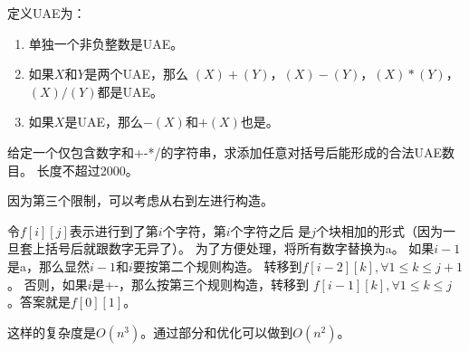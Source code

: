 \begin{prob}
	定义UAE为：
	\begin{enumerate}
		\item 单独一个非负整数是UAE。
		\item 如果$X$和$Y$是两个UAE，那么
			$(X)+(Y)$，$(X)-(Y)$，$(X)*(Y)$，$(X)/(Y)$都是UAE。
		\item 如果$X$是UAE，那么$-(X)$和$+(X)$也是。
	\end{enumerate}
	给定一个仅包含数字和+-*/的字符串，求添加任意对括号后能形成的合法UAE数目。
	长度不超过2000。
\end{prob}

\begin{sol}
	因为第三个限制，可以考虑从右到左进行构造。\par
	令$f[i][j]$表示进行到了第$i$个字符，第$i$个字符之后
	是$j$个块相加的形式（因为一旦套上括号后就跟数字无异了）。
	为了方便处理，将所有数字替换为a。
	如果$i-1$是a，那么显然$i-1$和$i$要按第二个规则构造。
	转移到$f[i-2][k], \forall 1 \le k \le j+1$。
	否则，如果$i$是+-，那么按第三个规则构造，转移到
	$f[i-1][k], \forall 1 \le k \le j$。答案就是$f[0][1]$。
	\par 这样的复杂度是$O(n^3)$。通过部分和优化可以做到$O(n^2)$。
\end{sol}
